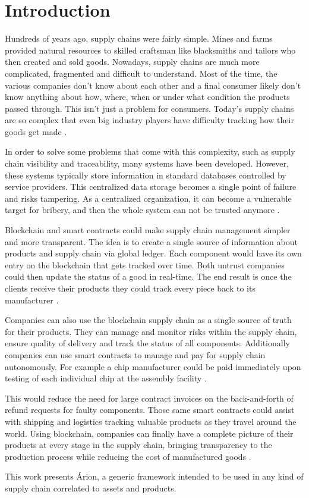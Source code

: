 \section{Introduction} \label{sec:Introduction}

Hundreds of years ago, supply chains were fairly simple. Mines and farms provided natural resources to skilled craftsman like blacksmiths and tailors who then created and sold goods. Nowadays, supply chains are much more complicated, fragmented and difficult to understand. Most of the time, the various companies don't know about each other and a final consumer likely don't know anything about how, where, when or under what condition the products passed through. This isn't just a problem for consumers. Today's supply chains are so complex that even big industry players have difficulty tracking how their goods get made \cite{swan2015blockchain}.


In order to solve some problems that come with this complexity, such as supply chain visibility and traceability, many systems have been developed. However, these systems typically store information in standard databases controlled by service providers. This centralized data storage becomes a single point of failure and risks tampering. As a centralized organization, it can become a vulnerable target for bribery, and then the whole system can not be trusted anymore \cite{tian2017supply}.

Blockchain and smart contracts could make supply chain management simpler and more transparent. The idea is to create a single source of information about products and supply chain via global ledger. Each component would have its own entry on the blockchain that gets tracked over time. Both untrust companies could then update the status of a good in real-time. The end result is once the clients receive their products they could track every piece back to its manufacturer \cite{greve2018blockchain}.

Companies can also use the blockchain supply chain as a single source of truth for their products. They can manage and monitor risks within the supply chain, ensure quality of delivery and track the status of all components. Additionally companies can use smart contracts to manage and pay for supply chain autonomously. For example a chip manufacturer could be paid immediately upon testing of each individual chip at the assembly facility \cite{tian2017supply}. 

This would reduce the need for large contract invoices on the back-and-forth of refund requests for faulty components. Those same smart contracts could assist with shipping and logistics tracking valuable products as they travel around the world. Using blockchain, companies can finally have a complete picture of their products at every stage in the supply chain, bringing transparency to the production process while reducing the cost of manufactured goods  \cite{swan2015blockchain}.

This work presents Árion, a generic framework intended to be used in any kind of supply chain correlated to assets and products.